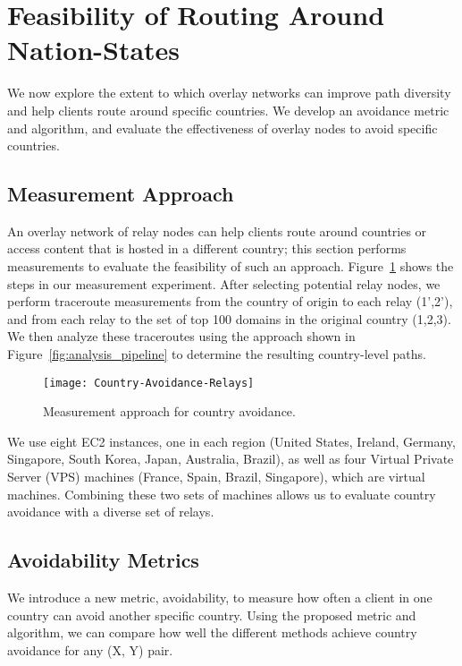 \section{Feasibility of Routing Around Nation-States}
\label{avoid_results}

We now explore the extent to which overlay networks can improve path diversity and help clients 
route around specific countries.  We develop an avoidance metric and algorithm, and
evaluate the effectiveness of overlay nodes to avoid specific countries.

\subsection{Measurement Approach}
\label{avoid_pipelines}

An overlay network of relay nodes can
help clients route around countries or access content 
that is hosted in a different country; this section performs measurements to evaluate
the feasibility of such an approach. Figure~\ref{fig:avoidance_relays}
shows the steps in our measurement experiment.
After selecting potential relay nodes, we perform traceroute measurements from
the country of origin to each relay (1',2'), and from each relay to the set of top 100 domains
in the original country (1,2,3). We
then analyze these traceroutes using the approach shown in Figure~\ref{fig:analysis_pipeline}
to determine the resulting country-level paths. 

\begin{figure}[t]
\centering
\texttt{[image: Country-Avoidance-Relays]}
\caption{Measurement approach for country avoidance.}
\label{fig:avoidance_relays}
\end{figure}

We use eight EC2 instances, one in each region
(United States, Ireland, Germany, Singapore, South Korea, Japan, Australia,
Brazil), as well as four Virtual Private Server (VPS) machines (France,
Spain, Brazil, Singapore), which are virtual machines.
Combining these two sets of machines allows us to evaluate country avoidance with a diverse set of relays. 

\subsection{Avoidability Metrics}
\label{metrics}

We introduce a new metric, avoidability, to measure how often a client in
one country can avoid another specific country.
Using the proposed metric
and algorithm, we can compare how well the different methods achieve
country avoidance for any (X, Y) pair.

